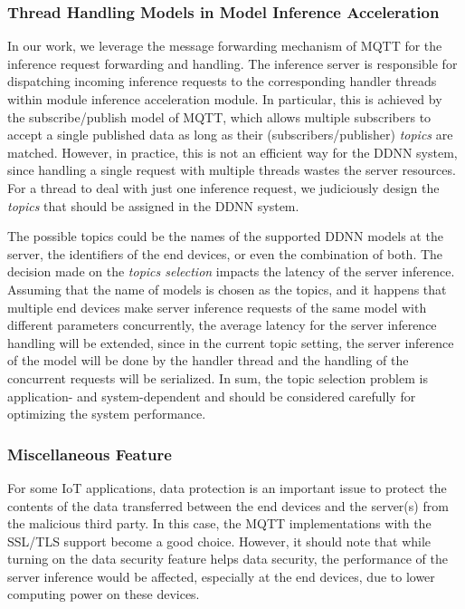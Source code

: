 \documentclass[conference]{IEEEtran}
\begin{document}
\subsubsection{Thread Handling Models in Model Inference Acceleration}
In our work, we leverage the message forwarding mechanism of MQTT for the inference request forwarding and handling. The inference server is responsible for dispatching incoming inference requests to the corresponding handler threads within module inference acceleration module. In particular, this is achieved by the subscribe/publish model of MQTT, which allows multiple subscribers to accept a single published data as long as their (subscribers/publisher) \emph{topics} are matched. However, in practice, this is not an efficient way for the DDNN system, since handling a single request with multiple threads wastes the server resources. For a thread to deal with just one inference request, we judiciously design the \emph{topics} that should be assigned in the DDNN system.

The possible topics could be the names of the supported DDNN models at the server, the identifiers of the end devices, or even the combination of both. The decision made on the \emph{topics selection} impacts the latency of the server inference. Assuming that the name of models is chosen as the topics, and it happens that multiple end devices make server inference requests of the same model with different parameters concurrently, the average latency for the server inference handling will be extended, since in the current topic setting, the server inference of the model will be done by the handler thread and the handling of the concurrent requests will be serialized. In sum, the topic selection problem is application- and system-dependent and should be considered carefully for optimizing the system performance.

\subsubsection{Miscellaneous Feature}
For some IoT applications, data protection is an important issue to protect the contents of the data transferred between the end devices and the server(s) from the malicious third party. In this case, the MQTT implementations with the SSL/TLS support become a good choice. However, it should note that while turning on the data security feature helps data security, the performance of the server inference would be affected, especially at the end devices, due to lower computing power on these devices.
\end{document}

